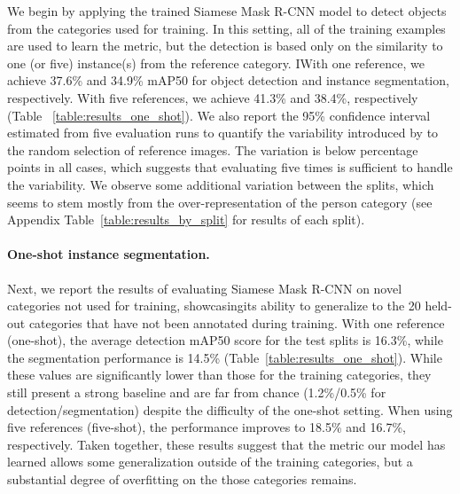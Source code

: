 \documentclass{article}
\begin{document}
We begin by applying the trained Siamese Mask R-CNN model to detect objects from the categories used for training. In this setting, all of the training examples are used to learn the metric, but the detection is based only on the similarity to one (or five) instance(s) from the reference category. IWith one reference, we achieve 37.6\% and 34.9\% mAP50 for object detection and instance segmentation, respectively. With five references, we achieve 41.3\% and 38.4\%, respectively (Table ~\ref{table:results_one_shot}). We also report the 95\% confidence interval estimated from five evaluation runs to quantify the variability introduced by to the random selection of reference images. The variation is below  percentage points in all cases, which suggests that evaluating five times is sufficient to handle the variability. We observe some additional variation between the splits, which seems to stem mostly from the over-representation of the person category (see Appendix Table~\ref{table:results_by_split} for results of each split).


\paragraph{One-shot instance segmentation.}







Next, we report the results of evaluating Siamese Mask R-CNN on novel categories not used for training, showcasingits ability to generalize to the 20 held-out categories that have not been annotated during training. With one reference (one-shot), the average detection mAP50 score for the test splits is 16.3\%, while the segmentation performance is 14.5\% (Table~\ref{table:results_one_shot}).
While these values are significantly lower than those for the training categories, they still present a strong baseline and are far from chance (1.2\%/0.5\% for detection/segmentation) despite the difficulty of the one-shot setting. When using five references (five-shot), the performance improves to 18.5\% and 16.7\%, respectively. Taken together, these results suggest that the metric our model has learned allows some generalization outside of the training categories, but a substantial degree of overfitting on the those categories remains.
\end{document}
